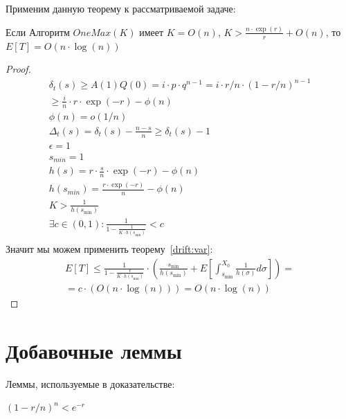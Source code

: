 \documentclass[times,specification,annotation]{itmo-student-thesis}
\begin{document}
    Применим данную теорему к рассматриваемой задаче: \\

    \begin{theorem}
        Если Алгоритм $OneMax(K)$ имеет
        $K = O(n)$, $K > \frac{n \cdot \exp(r)}{r} + O(n)$, то
        $E[T] = O(n \cdot \log(n))$
    \end{theorem}
    \begin{proof}
        \begin{gather*}
            \delta_t(s) \geq A(1)Q(0) = i \cdot p \cdot q^{n - 1} = i \cdot r/n \cdot (1 - r/n)^{n - 1} \\
            \geq \frac{i}{n} \cdot r \cdot \exp(-r) - \phi(n) \\
            \phi(n) = o(1/n) \\
            \Delta_t(s) = \delta_t(s) - \frac{n - s}{n} \geq \delta_t(s) - 1 \\
            \epsilon = 1\\
            s_{min} = 1 \\
            h(s) = r \cdot \frac{s}{n} \cdot \exp(-r) - \phi(n) \\
            h(s_{min}) = \frac{r \cdot \exp(-r)}{n} - \phi(n) \\
            K > \frac{1}{h(s_{\min})} \\
            \exists c \in (0, 1): \frac{1}{1 - \frac{1}{K \cdot h(s_{\min})}} < c \\
        \end{gather*}
        Значит мы можем применить теорему~\eqref{drift:var}:
        \begin{gather*}
            E[T] \leq \frac{1}{1 - \frac{\epsilon}{K \cdot h(s_{\min})}} \cdot (\frac{s_{\min}}{h(s_{\min})} + E[\int_{s_{\min}}^{X_0}\frac{1}{h(\sigma)}d\sigma]) = \\
            = c \cdot (O(n \cdot \log(n))) = O(n \cdot \log(n))
        \end{gather*}

    \end{proof}


    \section{Добавочные леммы}

    Леммы, используемые в доказательстве:
    \begin{lemma}
        \label{exp:less}
        $(1 - r/n)^n < e^{-r}$
    \end{lemma}
\end{document}
